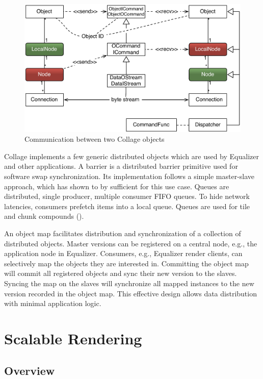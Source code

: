 \begin{figure}[ht]\center
  \includegraphics[width=\columnwidth]{images/netObject}
  \caption{\label{fNetObject}Communication between two \textsf{Collage} objects}
\end{figure}

\textsf{Collage} implements a few generic distributed objects which are used by
\textsf{Equalizer} and other applications. A barrier is a distributed barrier
primitive used for software swap synchronization. Its implementation follows a
simple master-slave approach, which has shown to by sufficient for this use
case. Queues are distributed, single producer, multiple consumer FIFO queues. To
hide network latencies, consumers prefetch items into a local queue. Queues are
used for tile and chunk compounds ().

An object map facilitates distribution and synchronization of a collection of
distributed objects. Master versions can be registered on a central node, e.g.,
the application node in \textsf{Equalizer}. Consumers, e.g., \textsf{Equalizer}
render clients, can selectively map the objects they are interested in.
Committing the object map will commit all registered objects and sync their new
version to the slaves. Syncing the map on the slaves will synchronize all mapped
instances to the new version recorded in the object map. This effective design
allows data distribution with minimal application logic.


\chapter{Scalable Rendering}\label{sScalable}

\section{Overview}

